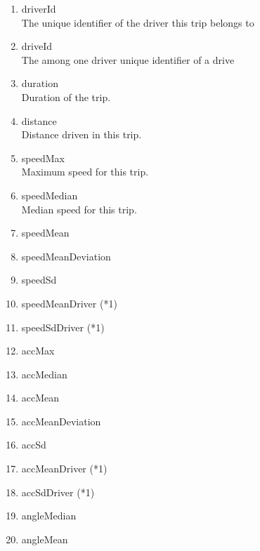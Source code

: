 \documentclass{vldb}
\begin{document}
\begin{enumerate}
\label{enum:all-features}
\item \label{itm:one} driverId\\
The unique identifier of the driver this trip belongs to
\item \label{itm:two} driveId\\
The among one driver unique identifier of a drive
\item \label{itm:three} duration\\
Duration of the trip.
\item \label{itm:four} distance\\
Distance driven in this trip.

\item \label{itm:five} speedMax\\
Maximum speed for this trip.
\item \label{itm:six} speedMedian\\
Median speed for this trip.
\item \label{itm:seven} speedMean
\item \label{itm:eight} speedMeanDeviation
\item \label{itm:nine} speedSd
\item \label{itm:ten} speedMeanDriver (*1)
\item \label{itm:eleven} speedSdDriver (*1)
\item \label{itm:twelve} accMax
\item \label{itm:thirteen} accMedian
\item \label{itm:fourteen} accMean
\item \label{itm:fifteen} accMeanDeviation
\item \label{itm:sixteen} accSd
\item \label{itm:seventeen} accMeanDriver (*1)
\item \label{itm:eighteen} accSdDriver (*1)
\item \label{itm:nineteen} angleMedian
\item \label{itm:twenty} angleMean

\end{enumerate}
\end{document}
